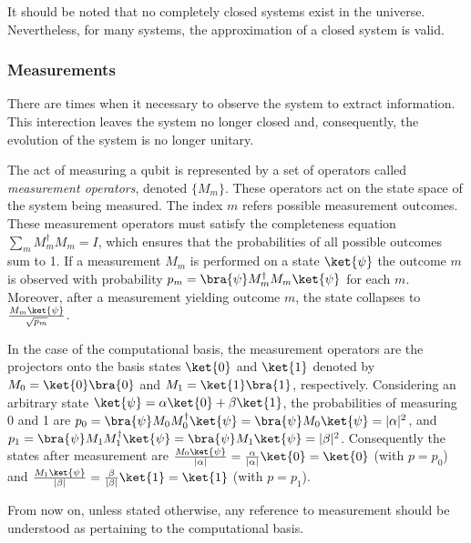It should be noted that no completely closed systems exist in the universe. Nevertheless, for many systems, the approximation of a closed system is valid.



\subsubsection{Measurements}


There are times when it necessary to observe the system to extract information. This interection leaves the system no longer closed and, consequently, the evolution of the system is no longer unitary. 

The act of measuring a qubit is represented by a set of operators called \emph{measurement operators}, denoted $\{M_{m}\}$. These operators act on the state space  of the system being measured. The index $m$ refers possible measurement outcomes. These measurement operators must satisfy the completeness equation $\sum_{m} M_{m}^{\dagger}M_{m} = I$, which ensures that the probabilities of all possible outcomes sum to 1. If a measurement ${M_m}$ is performed on a state $\ket{\psi}$ the outcome $m$ is observed with probability $p_m = \bra{\psi}M_{m}^{\dagger}M_{m}\ket{\psi}$ for each $m$. Moreover, after a measurement yielding outcome $m$, the state collapses to $\frac{M_{m}\ket{\psi}}{\sqrt{p_{m}}}$. 

In the case of the computational basis, the measurement operators are the projectors onto the basis states $\ket{0}$ and $\ket{1}$ denoted by $M_{0} = \ket{0}\bra{0}$ and $M_{1} = \ket{1}\bra{1}$, respectively. Considering an arbitrary state $\ket{\psi} = \alpha \ket{0} + \beta \ket{1}$, the probabilities of measuring 0 and 1 are $p_0 = \bra{\psi} M_{0} M_{0}^{\dag}\ket{\psi}=\bra{\psi} M_{0} \ket{\psi} = |\alpha|^{2}$, and $p_1 = \bra{\psi} M_{1} M_{1}^{\dag}\ket{\psi} = \bra{\psi} M_{1} \ket{\psi} =  |\beta|^{2} $. Consequently the states after measurement are $\frac{M_{0}\ket{\psi}} {|\alpha|} = \frac{\alpha}{|\alpha|} \ket{0} = \ket{0}$ (with $p=p_0$) and $\frac{M_{1}\ket{\psi}} {|\beta|} = \frac{\beta}{|\beta|} \ket{1} = \ket{1}$ (with $p=p_1$).

From now on, unless stated otherwise, any reference to measurement should be understood as pertaining to the computational basis.

